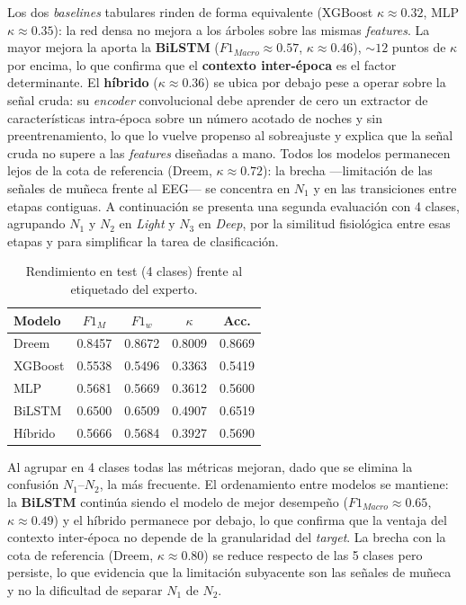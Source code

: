 \documentclass[conference]{IEEEtran}
\begin{document}
Los dos \emph{baselines} tabulares rinden de forma equivalente (XGBoost $\kappa\approx0.32$, MLP $\kappa\approx0.35$): la red densa no mejora a los árboles sobre las mismas \textit{features}. La mayor mejora la aporta la \textbf{BiLSTM} ($F1_{Macro}\approx0.57$, $\kappa\approx0.46$), $\sim\!12$ puntos de $\kappa$ por encima, lo que confirma que el \textbf{contexto inter-época} es el factor determinante. El \textbf{híbrido} ($\kappa\approx0.36$) se ubica por debajo pese a operar sobre la señal cruda: su \emph{encoder} convolucional debe aprender de cero un extractor de características intra-época sobre un número acotado de noches y sin preentrenamiento, lo que lo vuelve propenso al sobreajuste y explica que la señal cruda no supere a las \textit{features} diseñadas a mano. Todos los modelos permanecen lejos de la cota de referencia (Dreem, $\kappa\approx0.72$): la brecha ---limitación de las señales de muñeca frente al EEG--- se concentra en $N_1$ y en las transiciones entre etapas contiguas. A continuación se presenta una segunda evaluación con 4 clases, agrupando $N_1$ y $N_2$ en \textit{Light} y $N_3$ en \textit{Deep}, por la similitud fisiológica entre esas etapas y para simplificar la tarea de clasificación.
\vspace{-10pt}
\begin{table}[!ht]
\caption{Rendimiento en test (4 clases) frente al etiquetado del experto.}
\label{tab:resultados2}
\centering
\begin{tabular}{lcccc}
\hline
\textbf{Modelo} & \textbf{$F1_{M}$} & \textbf{$F1_{w}$} & \textbf{$\kappa$} & \textbf{Acc.} \\
\hline
Dreem & 0.8457 & 0.8672 & 0.8009 & 0.8669 \\
XGBoost & 0.5538 & 0.5496 & 0.3363 & 0.5419 \\
MLP & 0.5681 & 0.5669 & 0.3612 & 0.5600 \\
BiLSTM & 0.6500 & 0.6509 & 0.4907 & 0.6519 \\
Híbrido & 0.5666 & 0.5684 & 0.3927 & 0.5690 \\
\hline
\end{tabular}
\end{table}

Al agrupar en 4 clases todas las métricas mejoran, dado que se elimina la confusión $N_1$--$N_2$, la más frecuente. El ordenamiento entre modelos se mantiene: la \textbf{BiLSTM} continúa siendo el modelo de mejor desempeño ($F1_{Macro}\approx0.65$, $\kappa\approx0.49$) y el híbrido permanece por debajo, lo que confirma que la ventaja del contexto inter-época no depende de la granularidad del \textit{target}. La brecha con la cota de referencia (Dreem, $\kappa\approx0.80$) se reduce respecto de las 5 clases pero persiste, lo que evidencia que la limitación subyacente son las señales de muñeca y no la dificultad de separar $N_1$ de $N_2$.
\end{document}

